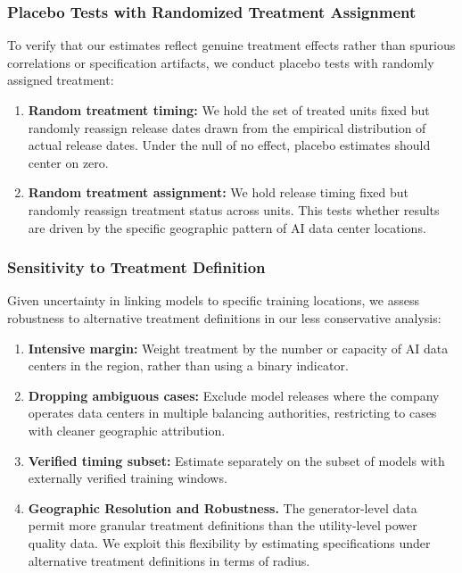 \documentclass[a4paper,fleqn,longmktitle]{cas-sc}
\newcommand{\nb}[1]{\textcolor{blue}{NB[#1]}}
\theoremstyle{plain}
\theoremstyle{definition}
\begin{document}
\subsubsection{Placebo Tests with Randomized Treatment Assignment}

To verify that our estimates reflect genuine treatment effects rather than spurious correlations or specification artifacts, we conduct placebo tests with randomly assigned treatment:
\begin{enumerate}
    \item \textbf{Random treatment timing:} We hold the set of treated units fixed but randomly reassign release dates drawn from the empirical distribution of actual release dates. Under the null of no effect, placebo estimates should center on zero.
    \item \textbf{Random treatment assignment:} We hold release timing fixed but randomly reassign treatment status across units. This tests whether results are driven by the specific geographic pattern of AI data center locations.
\end{enumerate}

\subsubsection{Sensitivity to Treatment Definition}

Given uncertainty in linking models to specific training locations, we assess robustness to alternative treatment definitions in our less conservative analysis:
\begin{enumerate}
    \item \textbf{Intensive margin:} Weight treatment by the number or capacity of AI data centers in the region, rather than using a binary indicator.
    \item \textbf{Dropping ambiguous cases:} Exclude model releases where the company operates data centers in multiple balancing authorities, restricting to cases with cleaner geographic attribution.
    \item \textbf{Verified timing subset:} Estimate separately on the subset of models with externally verified training windows.
    \item \textbf{Geographic Resolution and Robustness.} The generator-level data permit more granular treatment definitions than the utility-level power quality data. We exploit this flexibility by estimating specifications under alternative treatment definitions in terms of radius.
\end{enumerate}
\end{document}
